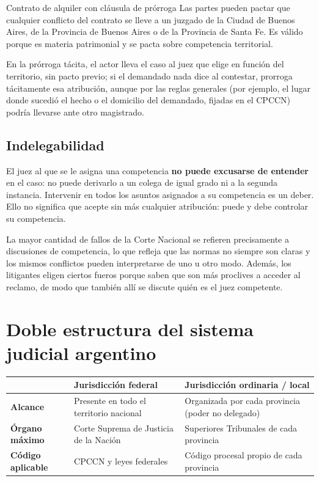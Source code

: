 \documentclass[12pt,oneside]{book}
\renewcommand{\arraystretch}{1.15}
\begin{document}
\begin{example}{Contrato de alquiler con cláusula de prórroga}
Las partes pueden pactar que cualquier conflicto del contrato se lleve a un juzgado de la Ciudad de Buenos Aires, de la Provincia de Buenos Aires o de la Provincia de Santa Fe. Es válido porque es materia patrimonial y se pacta sobre competencia territorial.
\end{example}

En la prórroga tácita, el actor lleva el caso al juez que elige en función del territorio, sin pacto previo; si el demandado nada dice al contestar, prorroga tácitamente esa atribución, aunque por las reglas generales (por ejemplo, el lugar donde sucedió el hecho o el domicilio del demandado, fijadas en el CPCCN) podría llevarse ante otro magistrado.

\subsection{Indelegabilidad}

El juez al que se le asigna una competencia \textbf{no puede excusarse de entender} en el caso: no puede derivarlo a un colega de igual grado ni a la segunda instancia. Intervenir en todos los asuntos asignados a su competencia es un deber. Ello no significa que acepte sin más cualquier atribución: puede y debe controlar su competencia.

La mayor cantidad de fallos de la Corte Nacional se refieren precisamente a discusiones de competencia, lo que refleja que las normas no siempre son claras y los mismos conflictos pueden interpretarse de uno u otro modo. Además, los litigantes eligen ciertos fueros porque saben que son más proclives a acceder al reclamo, de modo que también allí se discute quién es el juez competente.

\section{Doble estructura del sistema judicial argentino}

\begin{table}[H]
\centering
\renewcommand{\arraystretch}{1.3}
\begin{tabularx}{\textwidth}{>{\RaggedRight\arraybackslash}p{}>{\RaggedRight\arraybackslash}X>{\RaggedRight\arraybackslash}X}
\toprule
 & \textbf{Jurisdicción federal} & \textbf{Jurisdicción ordinaria / local} \\
\midrule
\textbf{Alcance} & Presente en todo el territorio nacional & Organizada por cada provincia (poder no delegado) \\
\addlinespace
\textbf{Órgano máximo} & Corte Suprema de Justicia de la Nación & Superiores Tribunales de cada provincia \\
\addlinespace
\textbf{Código aplicable} & CPCCN y leyes federales & Código procesal propio de cada provincia \\
\bottomrule
\end{tabularx}
\end{table}
\end{document}
